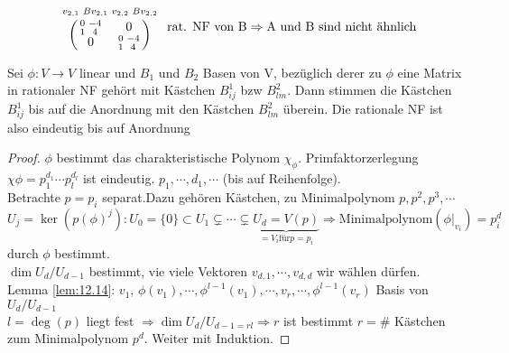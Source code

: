 \documentclass[a4paper, 10pt]{scrbook}
\begin{document}
\begin{ex}
\[
 \begin{tabular}{c}$
 \begin{smallmatrix}v_{2,1}&Bv_{2,1}&v_{2,2}&Bv_{2,2}\end{smallmatrix}$\\
 $\begin{pmatrix}\begin{smallmatrix}0&-4\\1&4\end{smallmatrix}&0\\ 
 0&\begin{smallmatrix}0&-4\\1&4\end{smallmatrix}
 \end{pmatrix}$ 
 \end{tabular} \text{rat. NF von B} \Rightarrow \text{A und B sind nicht ähnlich}
 \]

\end{ex}
\begin{prop}
	\label{prop:12.18}
	  Sei $\phi:V\longrightarrow V$ linear und $B_1$ und $B_2$ Basen von V, bezüglich derer zu $\phi$ eine Matrix in rationaler NF gehört mit Kästchen $B^1_{ij}$ bzw $B^2_{lm}$. 
	  Dann stimmen  die Kästchen $B^1_{ij}$ bis auf die Anordnung mit den Kästchen $B^2_{lm}$ überein. Die rationale NF ist also eindeutig bis auf Anordnung
	  \begin{proof}
	   $\phi$ bestimmt das charakteristische Polynom $\chi_{\phi}$. Primfaktorzerlegung $\chi{\phi}=p_1^{d_1}\cdots p_l^{d_l}$ ist eindeutig.
	   $p_1,\cdots ,d_1,\cdots$ (bis auf Reihenfolge).\\
	   Betrachte $p=p_i$ separat.Dazu gehören Kästchen, zu Minimalpolynom $p,p^2,p^3,\cdots$\\
	   $U_j=\ker(p(\phi)^j):U_0=\{0\}\subset U_1\subsetneq \cdots \subsetneq \underbrace{U_d=V(p)}_{=V_i \text{für}p=p_i} \Rightarrow \text{Minimalpolynom}(\phi |_{v_i} %
	   )=p_i^d$ durch $\phi$ bestimmt.\\
	   $\dim U_d/U_{d-1}$ bestimmt, vie viele Vektoren $v_{d,1},\cdots ,v_{d,d}$ wir wählen dürfen.\\
	   Lemma \ref{lem:12.14}: $v_1$, $\phi(v_1),\cdots,\phi^{l-1}(v_1),\cdots,v_r,\cdots,\phi^{l-1}(v_r)$ Basis von $U_d/U_{d-1}$\\
	   $l=\deg(p)$ liegt fest $\Rightarrow \dim U_d/U_{d-1=rl} \Rightarrow r$ ist bestimmt $r=\#$ Kästchen zum Minimalpolynom $p^d$. Weiter mit Induktion.
	  \end{proof}
\end{prop}
\end{document}
